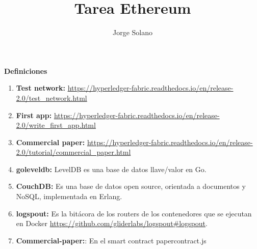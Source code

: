 \documentclass[12pt]{report}
\title{Tarea Ethereum}
\author{Jorge Solano}
\date{ }
\begin{document}
	\textbf{Definiciones}
	\begin{enumerate}
		\item \textbf{Test network: } \url{https://hyperledger-fabric.readthedocs.io/en/release-2.0/test_network.html}\\
		\item \textbf{First app: } \url{https://hyperledger-fabric.readthedocs.io/en/release-2.0/write\_first\_app.html}\\
		\item \textbf{Commercial paper: } \url{https://hyperledger-fabric.readthedocs.io/en/release-2.0/tutorial/commercial\_paper.html}\\
		\item \textbf{goleveldb:} LevelDB es una base de datos llave/valor en Go.\\
		\item \textbf{CouchDB:} Es una base de datos open source, orientada a documentos y NoSQL, implementada en Erlang.\\
		\item \textbf{logspout:} Es la bitácora de los routers de los contenedores que se ejecutan en Docker \url{https://github.com/gliderlabs/logspout#logspout}.\\
		\item \textbf{Commercial-paper:}: En el smart contract papercontract.js\\
	\end{enumerate}
\end{document}
